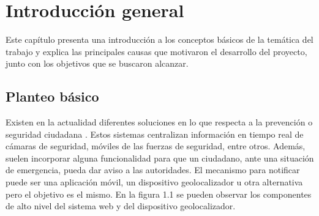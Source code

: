 
\chapter{Introducción general} %

\label{Chapter1} %
\label{IntroGeneral}


\newcommand{\keyword}[1]{\textbf{#1}}
\newcommand{\tabhead}[1]{\textbf{#1}}
\newcommand{\code}[1]{\texttt{#1}}
\newcommand{\file}[1]{\texttt{\bfseries#1}}
\newcommand{\option}[1]{\texttt{\itshape#1}}
\newcommand{\grados}{$^{\circ}$}



Este capítulo presenta una introducción a los conceptos básicos de la temática del trabajo y explica las principales causas que motivaron el desarrollo del proyecto, junto con los objetivos que se buscaron alcanzar.

\section{Planteo básico}

Existen en la actualidad diferentes soluciones en lo que respecta a la prevención o seguridad ciudadana \citep{PNUD:1}. Estos sistemas centralizan información en tiempo real de cámaras de seguridad, móviles de las fuerzas de seguridad, entre otros. Además, suelen incorporar alguna funcionalidad para que un ciudadano, ante una situación de emergencia, pueda dar aviso a las autoridades. El mecanismo para notificar puede ser una aplicación móvil, un dispositivo geolocalizador u otra alternativa pero el objetivo es el mismo. En la figura 1.1 se pueden observar los componentes de alto nivel del sistema web y del dispositivo geolocalizador.

